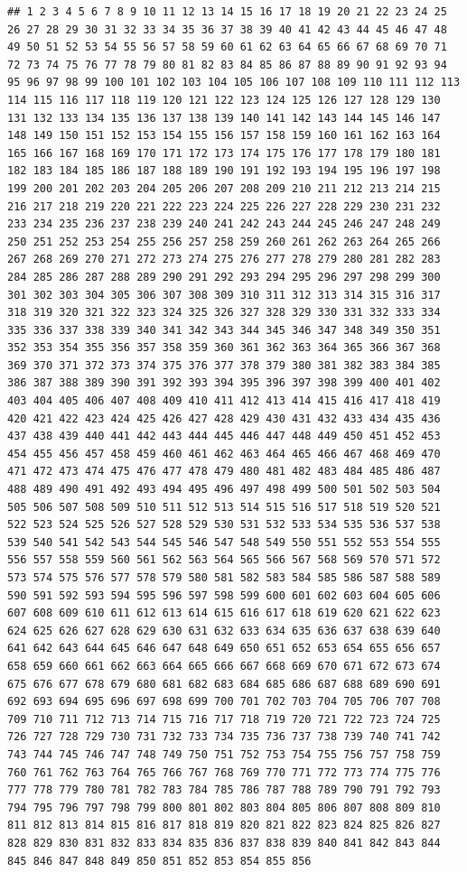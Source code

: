\documentclass[11pt,]{article}
\begin{document}
\begin{verbatim}
## 1 2 3 4 5 6 7 8 9 10 11 12 13 14 15 16 17 18 19 20 21 22 23 24 25 26 27 28 29 30 31 32 33 34 35 36 37 38 39 40 41 42 43 44 45 46 47 48 49 50 51 52 53 54 55 56 57 58 59 60 61 62 63 64 65 66 67 68 69 70 71 72 73 74 75 76 77 78 79 80 81 82 83 84 85 86 87 88 89 90 91 92 93 94 95 96 97 98 99 100 101 102 103 104 105 106 107 108 109 110 111 112 113 114 115 116 117 118 119 120 121 122 123 124 125 126 127 128 129 130 131 132 133 134 135 136 137 138 139 140 141 142 143 144 145 146 147 148 149 150 151 152 153 154 155 156 157 158 159 160 161 162 163 164 165 166 167 168 169 170 171 172 173 174 175 176 177 178 179 180 181 182 183 184 185 186 187 188 189 190 191 192 193 194 195 196 197 198 199 200 201 202 203 204 205 206 207 208 209 210 211 212 213 214 215 216 217 218 219 220 221 222 223 224 225 226 227 228 229 230 231 232 233 234 235 236 237 238 239 240 241 242 243 244 245 246 247 248 249 250 251 252 253 254 255 256 257 258 259 260 261 262 263 264 265 266 267 268 269 270 271 272 273 274 275 276 277 278 279 280 281 282 283 284 285 286 287 288 289 290 291 292 293 294 295 296 297 298 299 300 301 302 303 304 305 306 307 308 309 310 311 312 313 314 315 316 317 318 319 320 321 322 323 324 325 326 327 328 329 330 331 332 333 334 335 336 337 338 339 340 341 342 343 344 345 346 347 348 349 350 351 352 353 354 355 356 357 358 359 360 361 362 363 364 365 366 367 368 369 370 371 372 373 374 375 376 377 378 379 380 381 382 383 384 385 386 387 388 389 390 391 392 393 394 395 396 397 398 399 400 401 402 403 404 405 406 407 408 409 410 411 412 413 414 415 416 417 418 419 420 421 422 423 424 425 426 427 428 429 430 431 432 433 434 435 436 437 438 439 440 441 442 443 444 445 446 447 448 449 450 451 452 453 454 455 456 457 458 459 460 461 462 463 464 465 466 467 468 469 470 471 472 473 474 475 476 477 478 479 480 481 482 483 484 485 486 487 488 489 490 491 492 493 494 495 496 497 498 499 500 501 502 503 504 505 506 507 508 509 510 511 512 513 514 515 516 517 518 519 520 521 522 523 524 525 526 527 528 529 530 531 532 533 534 535 536 537 538 539 540 541 542 543 544 545 546 547 548 549 550 551 552 553 554 555 556 557 558 559 560 561 562 563 564 565 566 567 568 569 570 571 572 573 574 575 576 577 578 579 580 581 582 583 584 585 586 587 588 589 590 591 592 593 594 595 596 597 598 599 600 601 602 603 604 605 606 607 608 609 610 611 612 613 614 615 616 617 618 619 620 621 622 623 624 625 626 627 628 629 630 631 632 633 634 635 636 637 638 639 640 641 642 643 644 645 646 647 648 649 650 651 652 653 654 655 656 657 658 659 660 661 662 663 664 665 666 667 668 669 670 671 672 673 674 675 676 677 678 679 680 681 682 683 684 685 686 687 688 689 690 691 692 693 694 695 696 697 698 699 700 701 702 703 704 705 706 707 708 709 710 711 712 713 714 715 716 717 718 719 720 721 722 723 724 725 726 727 728 729 730 731 732 733 734 735 736 737 738 739 740 741 742 743 744 745 746 747 748 749 750 751 752 753 754 755 756 757 758 759 760 761 762 763 764 765 766 767 768 769 770 771 772 773 774 775 776 777 778 779 780 781 782 783 784 785 786 787 788 789 790 791 792 793 794 795 796 797 798 799 800 801 802 803 804 805 806 807 808 809 810 811 812 813 814 815 816 817 818 819 820 821 822 823 824 825 826 827 828 829 830 831 832 833 834 835 836 837 838 839 840 841 842 843 844 845 846 847 848 849 850 851 852 853 854 855 856 
\end{verbatim}
\end{document}
